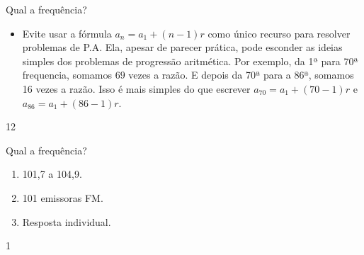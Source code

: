 \begin{sugestions}{Qual a frequência?}
{
\begin{itemize}
\item Evite usar a fórmula $a_n=a_1+(n−1)r$ como único recurso para resolver problemas de P.A. Ela, apesar de parecer prática, pode esconder as ideias simples dos problemas de progressão aritmética. Por exemplo, da 1ª para 70ª frequencia, somamos $69$ vezes a razão. E depois da 70ª para a 86ª, somamos 16 vezes a razão. Isso é mais simples do que escrever $a_70=a_1+(70−1)r$ e $a_86=a_1+(86−1)r$.
\end{itemize}
}{1}{2}
\end{sugestions}
\begin{answer}{Qual a frequência?}
{
\begin{enumerate}

\item 101,7 a 104,9.
\item 101 emissoras FM.
\item Resposta individual.

\end{enumerate}
}{1}
\end{answer}

\label{\detokenize{AF107-6::doc}}\label{\detokenize{AF107-6:praticando}}

